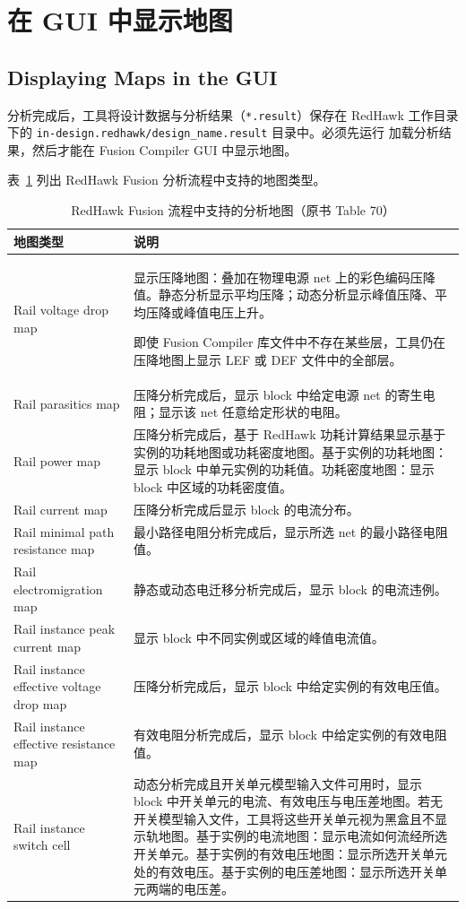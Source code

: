 \section{在 GUI 中显示地图}
\subsection*{Displaying Maps in the GUI}

分析完成后，工具将设计数据与分析结果（\texttt{*.result}）保存在 RedHawk 工作目录下的 \texttt{in-design.redhawk/design\_name.result} 目录中。必须先运行  加载分析结果，然后才能在 Fusion Compiler GUI 中显示地图。

表~\ref{tab:map-types} 列出 RedHawk Fusion 分析流程中支持的地图类型。

\begin{table}[htbp]
\centering
\caption{RedHawk Fusion 流程中支持的分析地图（原书 Table 70）}
\label{tab:map-types}
\small
\begin{tabularx}{\textwidth}{@{}l X@{}}
\toprule
\textbf{地图类型} & \textbf{说明} \\
\midrule
Rail voltage drop map &
显示压降地图：叠加在物理电源 net 上的彩色编码压降值。静态分析显示平均压降；动态分析显示峰值压降、平均压降或峰值电压上升。
\begin{noteBox}
即使 Fusion Compiler 库文件中不存在某些层，工具仍在压降地图上显示 LEF 或 DEF 文件中的全部层。
\end{noteBox} \\
Rail parasitics map &
压降分析完成后，显示 block 中给定电源 net 的寄生电阻；显示该 net 任意给定形状的电阻。 \\
Rail power map &
压降分析完成后，基于 RedHawk 功耗计算结果显示基于实例的功耗地图或功耗密度地图。基于实例的功耗地图：显示 block 中单元实例的功耗值。功耗密度地图：显示 block 中区域的功耗密度值。 \\
Rail current map &
压降分析完成后显示 block 的电流分布。 \\
Rail minimal path resistance map &
最小路径电阻分析完成后，显示所选 net 的最小路径电阻值。 \\
Rail electromigration map &
静态或动态电迁移分析完成后，显示 block 的电流违例。 \\
Rail instance peak current map &
显示 block 中不同实例或区域的峰值电流值。 \\
Rail instance effective voltage drop map &
压降分析完成后，显示 block 中给定实例的有效电压值。 \\
Rail instance effective resistance map &
有效电阻分析完成后，显示 block 中给定实例的有效电阻值。 \\
Rail instance switch cell &
动态分析完成且开关单元模型输入文件可用时，显示 block 中开关单元的电流、有效电压与电压差地图。若无开关模型输入文件，工具将这些开关单元视为黑盒且不显示轨地图。基于实例的电流地图：显示电流如何流经所选开关单元。基于实例的有效电压地图：显示所选开关单元处的有效电压。基于实例的电压差地图：显示所选开关单元两端的电压差。 \\
\bottomrule
\end{tabularx}
\end{table}

